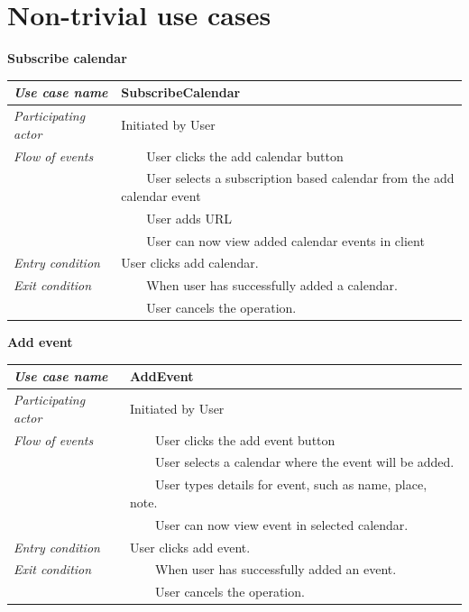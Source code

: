 \documentclass[10pt]{report}
\newcommand{\tabitem}{~~\llap{\textbullet}~~}
\numberwithin{equation}{section} %
\numberwithin{figure}{section} %
\numberwithin{table}{section} %
\begin{document}
\section{Non-trivial use cases}
\begin{table}[H]
\noindent \textbf{Subscribe calendar}\\
\begin{tabularx}{\textwidth}{l X}
\midrule
\textit{Use case name} & SubscribeCalendar \\ \midrule
\textit{Participating actor} & Initiated by User \\ \midrule
\textit{Flow of events} & \tabitem User clicks the add calendar button\\
                                       & \tabitem User selects a subscription
                                       based calendar from the add calendar
                                       event\\
                                       & \tabitem User adds URL\\
                                       & \tabitem User can now view added calendar events
                                       in client\\
                        \midrule
\textit{Entry condition} & User clicks add calendar.\\ \midrule
\textit{Exit condition} & \tabitem When user has successfully added a calendar. \\
						& \tabitem User cancels the operation.\\
                        \midrule
\end{tabularx}
\end{table}

\begin{table}[H]
\noindent \textbf{Add event}\\
\begin{tabularx}{\textwidth}{l X}
\midrule
\textit{Use case name} & AddEvent \\ \midrule
\textit{Participating actor} & Initiated by User \\ \midrule
\textit{Flow of events} & \tabitem User clicks the add event button\\
                                       & \tabitem User selects a calendar where
                                       the event will be added.\\
                                       & \tabitem User types details for event, such as
                                       name, place, note.\\
                                       & \tabitem User can now view event in selected calendar.\\
                        \midrule
\textit{Entry condition} & User clicks add event.\\ \midrule
\textit{Exit condition} & \tabitem When user has successfully added  an event. \\
						& \tabitem User cancels the operation.\\
                        \midrule
\end{tabularx}
\end{table}
\end{document}
